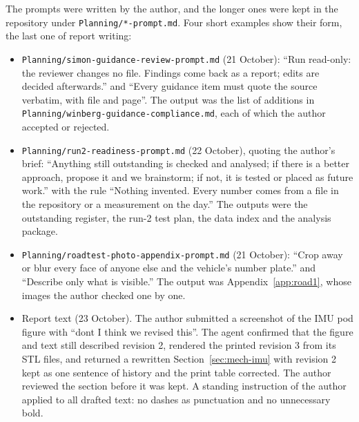 The prompts were written by the author, and the longer ones were kept in the repository under \texttt{Planning/\allowbreak{}*-prompt.md}. Four short examples show their form, the last one of report writing:
\begin{itemize}
\item \texttt{Planning/\allowbreak{}simon-guidance-review-prompt.md} (21 October): ``Run read-only: the reviewer changes no file. Findings come back as a report; edits are decided afterwards.'' and ``Every guidance item must quote the source verbatim, with file and page''. The output was the list of additions in \texttt{Planning/\allowbreak{}winberg-guidance-compliance.md}, each of which the author accepted or rejected.
\item \texttt{Planning/\allowbreak{}run2-readiness-prompt.md} (22 October), quoting the author's brief: ``Anything still outstanding is checked and analysed; if there is a better approach, propose it and we brainstorm; if not, it is tested or placed as future work.'' with the rule ``Nothing invented. Every number comes from a file in the repository or a measurement on the day.'' The outputs were the outstanding register, the run-2 test plan, the data index and the analysis package.
\item \texttt{Planning/\allowbreak{}roadtest-photo-appendix-prompt.md} (21 October): ``Crop away or blur every face of anyone else and the vehicle's number plate.'' and ``Describe only what is visible.'' The output was Appendix~\ref{app:road1}, whose images the author checked one by one.
\item Report text (23 October). The author submitted a screenshot of the IMU pod figure with ``dont I think we revised this''. The agent confirmed that the figure and text still described revision 2, rendered the printed revision 3 from its STL files, and returned a rewritten Section~\ref{sec:mech-imu} with revision 2 kept as one sentence of history and the print table corrected. The author reviewed the section before it was kept. A standing instruction of the author applied to all drafted text: no dashes as punctuation and no unnecessary bold.
\end{itemize}

